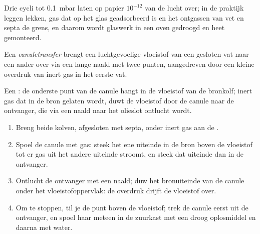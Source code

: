 Drie cycli tot \qty{0.1}{mbar} laten op papier $10^{-12}$ van de lucht over; in de praktijk
leggen lekken, gas dat op het glas geadsorbeerd is en het ontgassen van
vet en septa de grens, en daarom wordt glaswerk in een oven gedroogd en
heet gemonteerd.

\begin{definition}[Canuletransfer]\label{def:b3:lab-techniques-3:cannula}
Een \emph{canuletransfer} brengt een luchtgevoelige
vloeistof van een gesloten vat naar een ander over via een lange naald
met twee punten, aangedreven door een kleine overdruk van inert gas in
het eerste vat.
\end{definition}

\begin{omfigure}

{\small Een : de onderste punt van de canule hangt in de
vloeistof van de bronkolf; inert gas dat in de bron gelaten wordt, duwt de
vloeistof door de canule naar de ontvanger, die via een naald naar het
olieslot ontlucht wordt.}
\end{omfigure}

\begin{method}\label{met:b3:lab-techniques-3:cannula}
\begin{enumerate}
  \item Breng beide kolven, afgesloten met septa, onder inert gas aan de
        .
  \item Spoel de canule met gas: steek het ene uiteinde in de bron boven
        de vloeistof tot er gas uit het andere uiteinde stroomt, en steek
        dat uiteinde dan in de ontvanger.
  \item Ontlucht de ontvanger met een naald; duw het bronuiteinde van de
        canule onder het vloeistofoppervlak: de overdruk drijft de
        vloeistof over.
  \item Om te stoppen, til je de punt boven de vloeistof; trek de canule
        eerst uit de ontvanger, en spoel haar meteen in de zuurkast met een
        droog oplosmiddel en daarna met water.
\end{enumerate}
\end{method}

